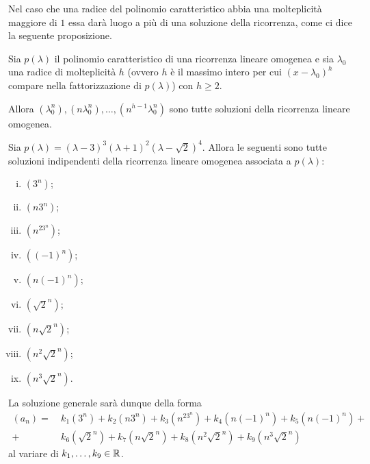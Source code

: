 Nel caso che una radice del polinomio caratteristico abbia una molteplicità maggiore di $1$ essa darà luogo a più di una soluzione della ricorrenza, come ci dice la seguente proposizione.
\begin{proposition}
    Sia $p(\lambda)$ il polinomio caratteristico di una ricorrenza lineare omogenea e sia $\lambda_0$ una radice di molteplicità $h$ (ovvero $h$ è il massimo intero per cui $(x - \lambda_0)^h$ compare nella fattorizzazione di $p(\lambda)$) con $h \geq 2$. 
    
    Allora $(\lambda_0^n), (n\lambda_0^n), \dots, (n^{h-1}\lambda_0^n)$ sono tutte soluzioni della ricorrenza lineare omogenea.
\end{proposition}

\begin{example}
    Sia $p(\lambda) = (\lambda - 3)^3(\lambda + 1)^2(\lambda - \sqrt2)^4$. Allora le seguenti sono tutte soluzioni indipendenti della ricorrenza lineare omogenea associata a $p(\lambda)$:
    \begin{multicols}{3}
        \begin{enumerate}[(i)]
        \item $(3^n)$;
        \item $(n3^n)$;
        \item $(n^23^n)$;
        \item $((-1)^n)$;
        \item $(n(-1)^n)$;
        \item $(\sqrt{2}^n)$;
        \item $(n\sqrt{2}^n)$;
        \item $(n^2\sqrt{2}^n)$;
        \item $(n^3\sqrt{2}^n)$.
    \end{enumerate}
    \end{multicols}
    
    La soluzione generale sarà dunque della forma \begin{align*}
        (a_n) = 
            &\ k_1(3^n) + k_2(n3^n) + k_3(n^23^n) + k_4(n(-1)^n) + k_5(n(-1)^n) + \\
            + &\ k_6(\sqrt{2}^n) + k_7(n\sqrt{2}^n) + k_8(n^2\sqrt{2}^n) + k_9(n^3\sqrt{2}^n)
    \end{align*}
    al variare di $k_1, \dots, k_9 \in \mathbb{R}$.
\end{example}